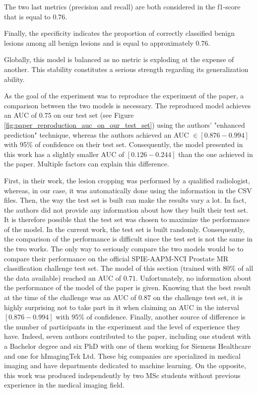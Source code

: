 \noindent The two last metrics (precision and recall) are both considered in the f1-score that is equal to $0.76$.

\noindent Finally, the specificity indicates the proportion of correctly classified benign lesions among all benign lesions and is equal to approximately $0.76$.

\noindent Globally, this model is balanced as no metric is exploding at the expense of another. This stability constitutes a serious strength regarding its generalization ability.

As the goal of the experiment was to reproduce the experiment of the paper, a comparison between the two models is necessary. The reproduced model achieves an AUC of $0.75$ on our test set (see Figure \ref{fig:paper_reproduction_auc_on_our_test_set}) using the authors' "enhanced prediction" technique, whereas the authors achieved an AUC $\in [0.876-0.994]$ with 95\% of confidence on their test set. Consequently, the model presented in this work has a slightly smaller AUC of $[0.126-0.244]$ than the one achieved in the paper. Multiple factors can explain this difference. 

First, in their work, the lesion cropping was performed by a qualified radiologist, whereas, in our case, it was automatically done using the information in the CSV files. Then, the way the test set is built can make the results vary a lot. In fact, the authors did not provide any information about how they built their test set. It is therefore possible that the test set was chosen to maximize the performance of the model. In the current work, the test set is built randomly. Consequently, the comparison of the performance is difficult since the test set is not the same in the two works. The only way to seriously compare the two models would be to compare their performance on the official SPIE-AAPM-NCI Prostate MR classification challenge test set. The model of this section (trained with 80\% of all the data available) reached an AUC of $0.71$. Unfortunately, no information about the performance of the model of the paper is given. Knowing that the best result at the time of the challenge was an AUC of $0.87$ on the challenge test set, it is highly surprising not to take part in it when claiming an AUC in the interval $[0.876-0.994]$ with 95\% of confidence. Finally, another source of difference is the number of participants in the experiment and the level of experience they have. Indeed, seven authors contributed to the paper, including one student with a Bachelor degree and six PhD with one of them working for Siemens Healthcare and one for hImagingTek Ltd. These big companies are specialized in medical imaging and have departments dedicated to machine learning. On the opposite, this work was produced independently by two MSc students without previous experience in the medical imaging field. 

